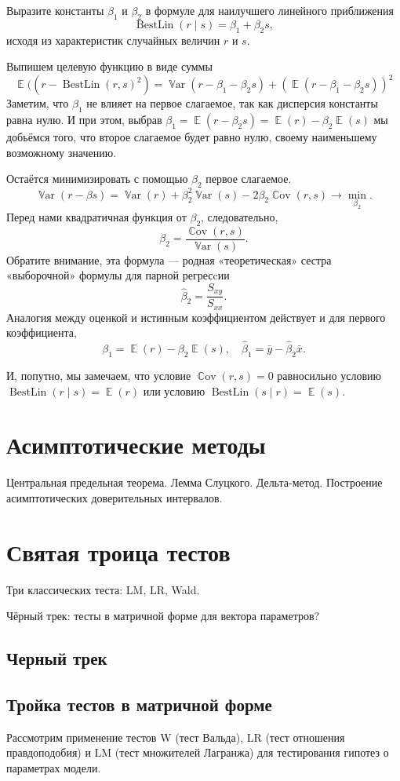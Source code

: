 \documentclass[12pt]{article}
\DeclareMathOperator{\Cov}{\mathbb{C}ov}
\DeclareMathOperator{\Var}{\mathbb{V}ar}
\DeclareMathOperator{\BestLin}{BestLin}
\DeclareMathOperator{\E}{\mathbb{E}}
\renewcommand{\b}{\beta}
\newcommand{\hb}{\hat{\beta}}
\begin{document}
\begin{problem}
Выразите константы $\b_1$ и $\b_2$ в формуле для наилучшего линейного приближения 
\[
\BestLin(r \mid s) = \b_1 + \b_2 s,
\]
исходя из характеристик случайных величин $r$ и $s$. 

\begin{sol}
Выпишем целевую функцию в виде суммы
\[
    \E((r - \BestLin(r, s)^2)  = \Var(r - \b_1- \beta_2 s) + (\E(r - \b_1 - \b_2 s))^2
\]
Заметим, что $\b_1$ не влияет на первое слагаемое, так как дисперсия константы равна нулю.
И при этом, выбрав $\b_1 = \E(r - \b_2 s) = \E(r) - \b_2\E(s)$ мы добьёмся того, что второе слагаемое будет равно нулю, своему наименьшему возможному значению. 

Остаётся минимизировать с помощью $\b_2$ первое слагаемое. 
\[
\Var(r - \beta s) = \Var(r) + \b_2^2 \Var(s) - 2 \b_2 \Cov(r, s) \to \min_{\b_2}.
\]
Перед нами квадратичная функция от $\b_2$, следовательно, 
\[
\b_2 = \frac{\Cov(r, s)}{ \Var(s)}.
\]
Обратите внимание, эта формула — родная «теоретическая» сестра «выборочной» формулы для парной регресcии
\[
\hb_2 = \frac{S_{xy}}{S_{xx}}.
\]
Аналогия между оценкой и истинным коэффициентом действует и для первого коэффициента,
\[
\b_1 = \E(r) - \b_2 \E(s), \quad  \hb_1 = \bar y - \hb_2 \bar x.
\]

И, попутно, мы замечаем, что условие $\Cov(r, s) = 0$ равносильно условию  $\BestLin(r \mid s) = \E(r)$ или условию $\BestLin(s \mid r) = \E(s)$.
\end{sol}
\end{problem}



\section{Асимптотические методы}
Центральная предельная теорема. Лемма Слуцкого. Дельта-метод. Построение асимптотических доверительных интервалов.


\section{Святая троица тестов}
Три классических теста: LM, LR, Wald.


Чёрный трек: тесты в матричной форме для вектора параметров?
\subsection{Черный трек}
\subsection{Тройка тестов в матричной форме}
Рассмотрим применение тестов W  (тест Вальда), LR (тест отношения правдоподобия) и LM (тест множителей Лагранжа) для тестирования гипотез о параметрах модели.
\end{document}

